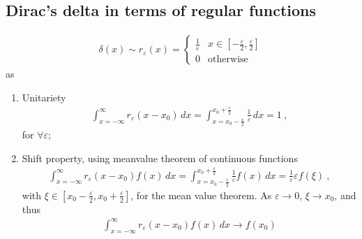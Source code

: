 \documentclass[letterpaper,10pt,english]{jupyterBook}
\begin{document}
\subsection{Dirac’s delta in terms of regular functions}
\label{\detokenize{ch/functional-analysis/dirac-delta:dirac-s-delta-in-terms-of-regular-functions}}
\sphinxAtStartPar
{}
\begin{equation*}
\begin{split}\delta(x) \sim r_{\varepsilon}(x) = \begin{cases} \frac{1}{\varepsilon} & x \in \left[-\frac{\varepsilon}{2}, \frac{\varepsilon}{2} \right] \\ 0 & \text{otherwise} \end{cases}\end{split}
\end{equation*}
\sphinxAtStartPar
as
\begin{enumerate}
%
\item {} 
\sphinxAtStartPar
Unitariety
\begin{equation*}
\begin{split}\int_{x=-\infty}^{\infty} r_{\varepsilon}(x-x_0) \, dx = \int_{x=x_0-\frac{\varepsilon}{2}}^{x_0+\frac{\varepsilon}{2}} \frac{1}{\varepsilon} \, dx = 1 \ ,  \end{split}
\end{equation*}
\sphinxAtStartPar
for \(\forall \varepsilon\);

\item {} 
\sphinxAtStartPar
Shift property, using mean\sphinxhyphen{}value theorem of continuous functions
\begin{equation*}
\begin{split}\int_{x=-\infty}^{\infty} r_{\varepsilon}(x-x_0) f(x) \, dx = \int_{x=x_0-\frac{\varepsilon}{2}}^{x_0+\frac{\varepsilon}{2}} \frac{1}{\varepsilon} f(x) \, dx = \frac{1}{\varepsilon} \varepsilon f(\xi) \ ,  \end{split}
\end{equation*}
\sphinxAtStartPar
with \(\xi \in \left[x_0-\frac{\varepsilon}{2}, x_0+\frac{\varepsilon}{2}\right]\), for the mean value theorem. As \(\varepsilon \rightarrow 0\), \(\xi \rightarrow x_0\), and thus
\begin{equation*}
\begin{split}\int_{x=-\infty}^{\infty} r_{\varepsilon}(x-x_0) f(x) \, dx \rightarrow f(x_0) \end{split}
\end{equation*}
\end{enumerate}
\end{document}
